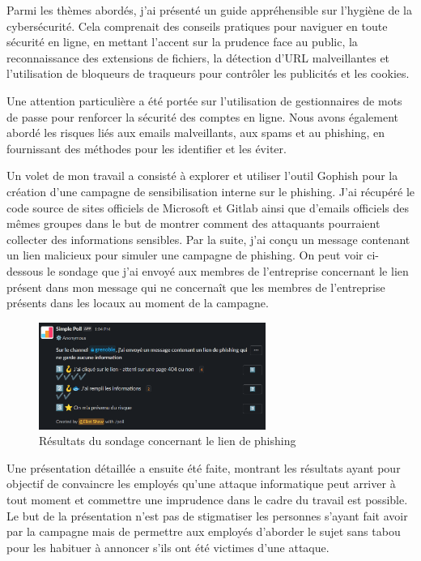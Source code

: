 Parmi les thèmes abordés, j'ai présenté un guide appréhensible sur l'hygiène de la cybersécurité.
Cela comprenait des conseils pratiques pour naviguer en toute sécurité en ligne, en mettant l'accent sur la prudence face au public, la reconnaissance des extensions de fichiers, la détection d'URL malveillantes et l'utilisation de bloqueurs de traqueurs pour contrôler les publicités et les cookies.

Une attention particulière a été portée sur l'utilisation de gestionnaires de mots de passe pour renforcer la sécurité des comptes en ligne.
Nous avons également abordé les risques liés aux emails malveillants, aux spams et au phishing, en fournissant des méthodes pour les identifier et les éviter.

Un volet de mon travail a consisté à explorer et utiliser l'outil Gophish pour la création d'une campagne de sensibilisation interne sur le phishing.
J'ai récupéré le code source de sites officiels de Microsoft et Gitlab ainsi que d'emails officiels des mêmes groupes dans le but de montrer comment des attaquants pourraient collecter des informations sensibles.
Par la suite, j'ai conçu un message contenant un lien malicieux pour simuler une campagne de phishing.
On peut voir ci-dessous le sondage que j'ai envoyé aux membres de l'entreprise concernant le lien présent dans mon message qui ne concernaît que les membres de l'entreprise présents dans les locaux au moment de la campagne.

\begin{figure}[ht!]
    \centering
    \includegraphics[width=0.66\textwidth]{paper/figures/poll.png}
    \caption{Résultats du sondage concernant le lien de phishing}
    \label{fig:poll}
\end{figure}

Une présentation détaillée a ensuite été faite, montrant les résultats ayant pour objectif de convaincre les employés qu'une attaque informatique peut arriver à tout moment et commettre une imprudence dans le cadre du travail est possible.
Le but de la présentation n'est pas de stigmatiser les personnes s'ayant fait avoir par la campagne mais de permettre aux employés d'aborder le sujet sans tabou pour les habituer à annoncer s'ils ont été victimes d'une attaque.


